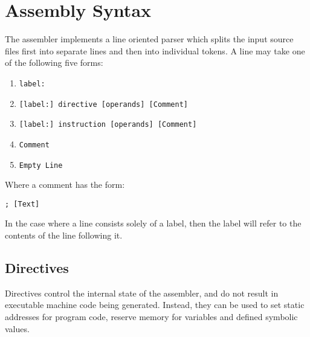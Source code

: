 \documentclass[12pt,twoside]{report}
\begin{document}
\chapter{Assembly Syntax}

The assembler implements a line oriented parser which splits the input
source files first into separate lines and then into individual
tokens. A line may take one of the following five forms:

\begin{enumerate}
\item \texttt{label:}
\item \texttt{[label:] directive [operands] [Comment]}
\item \texttt{[label:] instruction [operands] [Comment]}
\item \texttt{Comment}
\item \texttt{Empty Line}
\end{enumerate}

Where a comment has the form:

\begin{verbatim}
; [Text]
\end{verbatim}

In the case where a line consists solely of a label, then the label
will refer to the contents of the line following it.

\section{Directives}

Directives control the internal state of the assembler, and do not
result in executable machine code being generated. Instead, they can
be used to set static addresses for program code, reserve memory for
variables and defined symbolic values.
\end{document}
